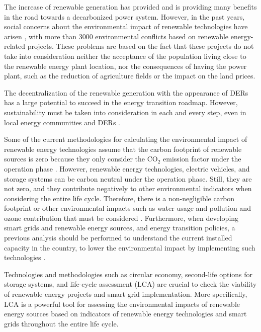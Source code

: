 The increase of renewable generation has provided and is providing many benefits in the road towards a decarbonized power system. However, in the past years, social concerns about the environmental impact of renewable technologies have arisen \cite{Temper2020}, with more than 3000 environmental conflicts based on renewable energy-related projects. These problems are based on the fact that these projects do not take into consideration neither the acceptance of the population living close to the renewable energy plant location, nor the consequences of having the power plant, such as the reduction of agriculture fields or the impact on the land prices. 


The decentralization of the renewable generation with the appearance of DERs has a large potential to succeed in the energy transition roadmap. However, sustainability must be taken into consideration in each and every step, even in local energy communities and DERs \cite{AMPONSAH2014461}.

Some of the current methodologies for calculating the environmental impact of renewable energy technologies assume that the carbon footprint of renewable sources is zero because they only consider the CO$_2$ emission factor under the operation phase \cite{IRENA2020}. However, renewable energy technologies, electric vehicles, and storage systems can be carbon neutral under the operation phase. Still, they are not zero, and they contribute negatively to other environmental indicators when considering the entire life cycle. Therefore, there is a non-negligible carbon footprint or other environmental impacts such as water usage and pollution and ozone contribution that must be considered \cite{en12214214, Moro2017, Jiang2018}. Furthermore, when developing smart grids and renewable energy sources, and energy transition policies, a previous analysis should be performed to understand the current installed capacity in the country, to lower the environmental impact by implementing such technologies \cite{Treyer2014}.
%

Technologies and methodologies such as circular economy, second-life options for storage systems, and life-cycle assessment (LCA) are crucial to check the viability of renewable energy projects and smart grid implementation. More specifically, LCA is a powerful tool for assessing the environmental impacts of renewable energy sources based on indicators of renewable energy technologies and smart grids throughout the entire life cycle. 



